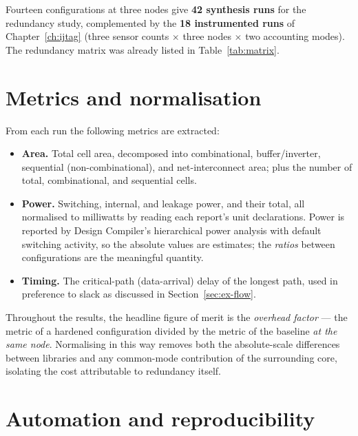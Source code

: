 Fourteen configurations at three nodes give \textbf{42 synthesis runs} for the
redundancy study, complemented by the \textbf{18 instrumented runs} of
Chapter~\ref{ch:ijtag} (three sensor counts $\times$ three nodes $\times$ two
accounting modes). The redundancy matrix was already listed in
Table~\ref{tab:matrix}.

\section{Metrics and normalisation}
\label{sec:ex-metrics}

From each run the following metrics are extracted:

\begin{itemize}
  \item \textbf{Area.} Total cell area, decomposed into combinational,
        buffer/inverter, sequential (non-combinational), and net-interconnect
        area; plus the number of total, combinational, and sequential cells.
  \item \textbf{Power.} Switching, internal, and leakage power, and their total,
        all normalised to milliwatts by reading each report's unit declarations.
        Power is reported by Design Compiler's hierarchical power analysis with
        default switching activity, so the absolute values are estimates; the
        \emph{ratios} between configurations are the meaningful quantity.
  \item \textbf{Timing.} The critical-path (data-arrival) delay of the longest
        path, used in preference to slack as discussed in
        Section~\ref{sec:ex-flow}.
\end{itemize}

Throughout the results, the headline figure of merit is the \emph{overhead
factor} --- the metric of a hardened configuration divided by the metric of the
baseline \emph{at the same node}. Normalising in this way removes both the
absolute-scale differences between libraries and any common-mode contribution of
the surrounding core, isolating the cost attributable to redundancy itself.

\section{Automation and reproducibility}
\label{sec:ex-auto}

